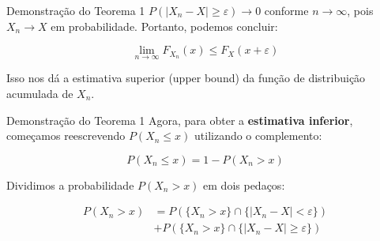 \documentclass[12pt]{beamer}
\begin{document}
\begin{frame}{}
	\begin{block}{Demonstração do Teorema 1}
	\( P(|X_n - X| \geq \varepsilon) \to 0 \) conforme \( n \to \infty \), pois \( X_n \to X \) em probabilidade. Portanto, podemos concluir:
		
		\[
		\lim_{n \to \infty} F_{X_n}(x) \leq F_X(x + \varepsilon)
		\]
		
		Isso nos dá a estimativa superior (upper bound) da função de distribuição acumulada de \( X_n \).
	\end{block}
\end{frame}


\begin{frame}{}
	\begin{block}{Demonstração do Teorema 1}
	Agora, para obter a \textbf{estimativa inferior}, começamos reescrevendo \( P(X_n \leq x) \) utilizando o complemento:
	
	\[
	P(X_n \leq x) = 1 - P(X_n > x)
	\]
	
	Dividimos a probabilidade \( P(X_n > x) \) em dois pedaços:
	
\begin{align*}
	P(X_n > x) &= P(\{X_n > x\} \cap \{|X_n - X| < \varepsilon\})\\
	& + P(\{X_n > x\} \cap \{|X_n - X| \geq \varepsilon\})
\end{align*}
	\end{block}
\end{frame}


\end{document}
